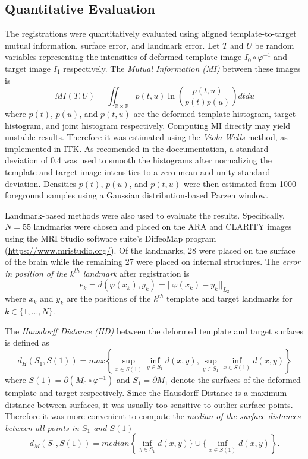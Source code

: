 \documentclass[]{spie}  %
\begin{document}
\subsection{Quantitative Evaluation}
The registrations were quantitatively evaluated using aligned template-to-target mutual information, surface error, and landmark error.
Let $T$ and $U$ be random variables representing the intensities of deformed template image $I_0 \circ \varphi^{-1}$ and target image $I_1$ respectively.
The \emph{Mutual Information (MI)} between these images is
\begin{equation*}
 MI(T,U) = \iint_{\mathbb{R}\times\mathbb{R}} p(t,u) \ln \left(\frac{p(t,u)}{p(t)p(u)}\right)dt du
\end{equation*}
where $p(t)$, $p(u)$, and $p(t,u)$ are the deformed template histogram, target histogram, and joint histogram respectively.
Computing MI directly may yield unstable results.
Therefore it was estimated using the \emph{Viola-Wells} method, as implemented in ITK.
As recomended in the doccumentation, a standard deviation of 0.4 was used to smooth the histograms after normalizing the template and target image intensities to a zero mean and unity standard deviation.
Densities $p(t)$, $p(u)$, and $p(t,u)$  were then estimated from 1000 foreground samples using a Gaussian distribution-based Parzen window.

Landmark-based methods were also used to evaluate the results.  
Specifically, $N = 55$ landmarks were chosen and placed on the ARA and CLARITY images using the MRI Studio software suite's DiffeoMap program (\url{https://www.mristudio.org/}).
Of the landmarks, 28 were placed on the surface of the brain while the remaining 27 were placed on internal structures.
The \emph{error in position of the $k^{th}$ landmark} after registration is
\begin{equation*}
 e_k = d(\varphi(x_k), y_k) = || \varphi(x_k) - y_k ||_{L_2}
\end{equation*}
where $x_k$ and $y_k$ are the positions of the $k^{th}$ template and target landmarks for $k \in \{1,..., N\}$.

The \emph{Hausdorff Distance (HD)} between the deformed template and target surfaces is defined as
\begin{equation*}
 d_H(S_1,S(1)) = max \left\{ \sup_{x \in S(1)} \inf_{y \in S_1} d(x,y), \sup_{y \in S_1} \inf_{x \in S(1)} d(x,y) \right\}
\end{equation*}
where $S(1) = \partial(M_0 \circ \varphi^{-1})$ and $S_1 = \partial M_1$ denote the surfaces of the deformed template and target respectively.
Since the Hausdorff Distance is a maximum distance between surfaces, it was usually too sensitive to outlier surface points.
Therefore it was more convenient to compute the \emph{median of the surface distances between all points in $S_1$ and $S(1)$}
\begin{equation*}
 d_M(S_1, S(1)) = median\left\{\inf_{y \in S_1} d(x,y) \} \cup  \{\inf_{x \in S(1)} d(x,y)\right\}.
\end{equation*}
\end{document}
